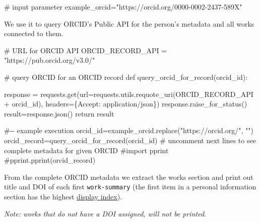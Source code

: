 \documentclass[
  letterpaper,
  DIV=11,
  numbers=noendperiod]{scrreprt}
\newenvironment{Shaded}{\begin{snugshade}}{\end{snugshade}}
\newcommand{\CommentTok}[1]{\textcolor[rgb]{0.37,0.37,0.37}{#1}}
\newcommand{\ControlFlowTok}[1]{\textcolor[rgb]{0.00,0.23,0.31}{#1}}
\newcommand{\KeywordTok}[1]{\textcolor[rgb]{0.00,0.23,0.31}{#1}}
\newcommand{\NormalTok}[1]{\textcolor[rgb]{0.00,0.23,0.31}{#1}}
\newcommand{\OperatorTok}[1]{\textcolor[rgb]{0.37,0.37,0.37}{#1}}
\newcommand{\StringTok}[1]{\textcolor[rgb]{0.13,0.47,0.30}{#1}}
\begin{document}
\begin{Shaded}
\begin{Highlighting}[]
\CommentTok{\# input parameter}
\NormalTok{example\_orcid}\OperatorTok{=}\StringTok{"https://orcid.org/0000{-}0002{-}2437{-}589X"}
\end{Highlighting}
\end{Shaded}

We use it to query ORCID's Public API for the person's metadata and all
works connected to them.

\begin{Shaded}
\begin{Highlighting}[]
\CommentTok{\# URL for ORCID API}
\NormalTok{ORCID\_RECORD\_API }\OperatorTok{=} \StringTok{"https://pub.orcid.org/v3.0/"}

\CommentTok{\# query ORCID for an ORCID record}
\KeywordTok{def}\NormalTok{ query\_orcid\_for\_record(orcid\_id):}

\NormalTok{    response }\OperatorTok{=}\NormalTok{ requests.get(url}\OperatorTok{=}\NormalTok{requests.utils.requote\_uri(ORCID\_RECORD\_API }\OperatorTok{+}\NormalTok{ orcid\_id),}
\NormalTok{                          headers}\OperatorTok{=}\NormalTok{\{}\StringTok{\textquotesingle{}Accept\textquotesingle{}}\NormalTok{: }\StringTok{\textquotesingle{}application/json\textquotesingle{}}\NormalTok{\})}
\NormalTok{    response.raise\_for\_status()}
\NormalTok{    result}\OperatorTok{=}\NormalTok{response.json()}
    \ControlFlowTok{return}\NormalTok{ result}


\CommentTok{\#{-}{-} example execution}
\NormalTok{orcid\_id}\OperatorTok{=}\NormalTok{example\_orcid.replace(}\StringTok{"https://orcid.org/"}\NormalTok{, }\StringTok{""}\NormalTok{)}
\NormalTok{orcid\_record}\OperatorTok{=}\NormalTok{query\_orcid\_for\_record(orcid\_id)}
\CommentTok{\# uncomment next lines to see complete metadata for given ORCID}
\CommentTok{\#import pprint}
\CommentTok{\#pprint.pprint(orcid\_record)}
\end{Highlighting}
\end{Shaded}

From the complete ORCID metadata we extract the works section and print
out title and DOI of each first \texttt{work-summary} (the first item in
a personal information section has the highest
\href{https://info.orcid.org/documentation/integration-guide/orcid-record/\#Display_index}{display
index}).

\emph{Note: works that do not have a DOI assigned, will not be printed.}
\end{document}
